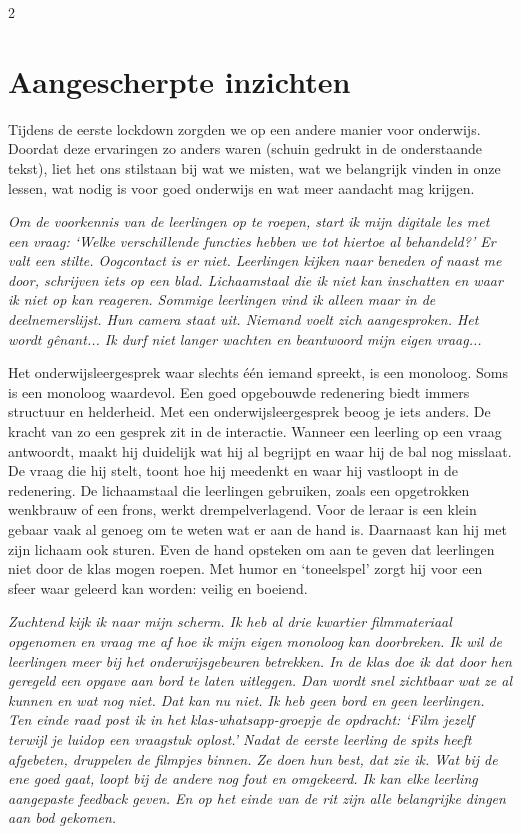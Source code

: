 \begin{multicols}{2}
\section{Aangescherpte inzichten}

Tijdens de eerste lockdown zorgden we op een andere manier voor onderwijs. Doordat deze ervaringen zo anders waren (schuin gedrukt in de onderstaande tekst), liet het ons stilstaan bij wat we misten, wat we belangrijk vinden in onze lessen, wat nodig is voor goed onderwijs en wat meer aandacht mag krijgen.

\emph{Om de voorkennis van de leerlingen op te roepen, start ik mijn digitale les met een vraag: `Welke verschillende functies hebben we tot hiertoe al behandeld?' Er valt een stilte. Oogcontact is er niet. Leerlingen kijken naar beneden of naast me door, schrijven iets op een blad. Lichaamstaal die ik niet kan inschatten en waar ik niet op kan reageren.   Sommige leerlingen vind ik alleen maar in de deelnemerslijst. Hun camera staat uit. Niemand voelt zich aangesproken. Het wordt gênant... Ik durf niet langer wachten en beantwoord mijn eigen vraag... }

Het onderwijsleergesprek waar slechts één iemand spreekt, is een monoloog. Soms is een monoloog waardevol. Een goed opgebouwde redenering biedt immers structuur en helderheid. Met een onderwijsleergesprek beoog je iets anders. De kracht van zo een gesprek zit in de interactie. Wanneer een leerling op een vraag antwoordt, maakt hij duidelijk wat hij al begrijpt en waar hij de bal nog misslaat. De vraag die hij stelt, toont hoe hij meedenkt en waar hij vastloopt in de redenering. De lichaamstaal die leerlingen gebruiken, zoals een opgetrokken wenkbrauw of een frons, werkt drempelverlagend. Voor de leraar is een klein gebaar vaak al genoeg om te weten wat er aan de hand is. Daarnaast kan hij met zijn lichaam ook sturen. Even de hand opsteken om aan te geven dat leerlingen niet door de klas mogen roepen. Met humor en `toneelspel' zorgt hij voor een sfeer waar geleerd kan worden: veilig en boeiend.

\emph{Zuchtend kijk ik naar mijn scherm. Ik heb al drie kwartier filmmateriaal opgenomen en vraag me af hoe ik mijn eigen monoloog kan doorbreken. Ik wil de leerlingen meer bij het onderwijsgebeuren betrekken. In de klas doe ik dat door hen geregeld een opgave aan bord te laten uitleggen. Dan wordt snel zichtbaar wat ze al kunnen en wat nog niet. Dat kan nu niet. Ik heb geen bord en geen leerlingen. Ten einde raad post ik in het klas-whatsapp-groepje de opdracht: `Film jezelf terwijl je luidop een vraagstuk oplost.' Nadat de eerste leerling de spits heeft afgebeten, druppelen de filmpjes binnen. Ze doen hun best, dat zie ik. Wat bij de ene goed gaat, loopt bij de andere nog fout en omgekeerd. Ik kan elke leerling aangepaste feedback geven. En op het einde van de rit zijn alle belangrijke dingen aan bod gekomen.}


\end{multicols}
